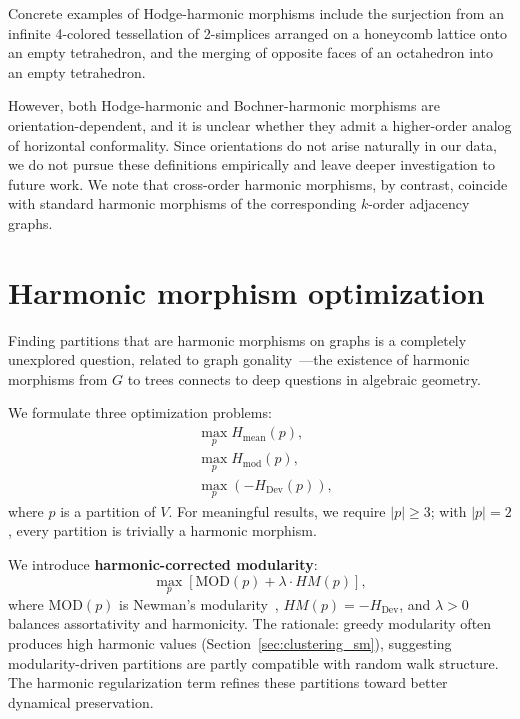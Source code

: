 \documentclass[twocolumn,superscriptaddress,tightenlines,aps,prx,floatfix]{revtex4-2}
\begin{document}
\begin{bibunit}
Concrete examples of Hodge-harmonic morphisms include the surjection from an infinite 4-colored tessellation of 2-simplices arranged on a honeycomb lattice onto an empty tetrahedron, and the merging of opposite faces of an octahedron into an empty tetrahedron.

However, both Hodge-harmonic and Bochner-harmonic morphisms are orientation-dependent, and it is unclear whether they admit a higher-order analog of horizontal conformality. Since orientations do not arise naturally in our data, we do not pursue these definitions empirically and leave deeper investigation to future work. We note that cross-order harmonic morphisms, by contrast, coincide with standard harmonic morphisms of the corresponding $k$-order adjacency graphs.


\section{Harmonic morphism optimization}
\label{sec:optimization_sm}

Finding partitions that are harmonic morphisms on graphs is a completely unexplored question, related to graph gonality~\cite{Caporaso_Gonality_2}---the existence of harmonic morphisms from $G$ to trees connects to deep questions in algebraic geometry.

We formulate three optimization problems:
\begin{align}
&\max_{p} H_{\text{mean}}(p), \\
&\max_{p} H_{\text{mod}}(p), \\
&\max_{p} (-H_{\text{Dev}}(p)),
\end{align}
where $p$ is a partition of $V$. For meaningful results, we require $|p| \geq 3$; with $|p|=2$, every partition is trivially a harmonic morphism.

We introduce \textbf{harmonic-corrected modularity}:
\begin{equation}
\max_p \left[ \text{MOD}(p) + \lambda \cdot HM(p) \right],
\end{equation}
where $\text{MOD}(p)$ is Newman's modularity~\cite{Modularity_Newman_2006}, $HM(p) = -H_{\text{Dev}}$, and $\lambda > 0$ balances assortativity and harmonicity. The rationale: greedy modularity often produces high harmonic values (Section~\ref{sec:clustering_sm}), suggesting modularity-driven partitions are partly compatible with random walk structure. The harmonic regularization term refines these partitions toward better dynamical preservation.


\end{bibunit}
\end{document}
